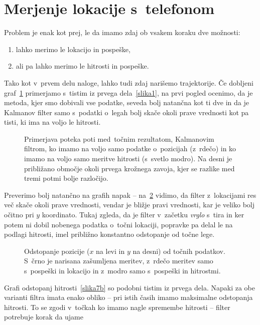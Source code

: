 \documentclass[a4paper,pdftex,10pt]{article}
\numberwithin{figure}{section} %
\begin{document}
\section{Merjenje lokacije s~telefonom}
Problem je enak kot prej, le da imamo zdaj ob vsakem koraku dve možnosti:
\begin{enumerate}[label=(\alph*)]
    \item lahko merimo le lokacijo in pospeške,
    \item ali pa lahko merimo le hitrosti in pospeške.
\end{enumerate}
Tako kot v~prvem delu naloge, lahko tudi zdaj narišemo trajektorije. Če dobljeni 
graf~\ref{slika6} primerjamo s~tistim iz prvega dela~\ref{slika1}, na prvi pogled ocenimo,
da je metoda, kjer smo dobivali vse podatke, seveda bolj natančna kot ti dve in da je 
Kalmanov filter samo s~podatki o~legah bolj skače okoli prave vrednosti kot pa tisti, ki 
ima na voljo le hitrosti. \begin{figure}[H]
    \centering
    \resizebox{.49\linewidth}{!}{}
    \resizebox{.49\linewidth}{!}{}
    \caption{Primerjava poteka poti med~točnim rezultatom, Kalmanovim filtrom, ko imamo
    na voljo samo podatke o~pozicijah (z~rdečo) in ko imamo na voljo samo meritve hitrosti
    (s~svetlo modro). Na desni je približano območje okoli prvega krožnega zavoja, kjer se
    razlike med tremi potmi bolje razločijo.}
    \label{slika6}
\end{figure}
Preverimo bolj natančno na grafih napak -- na~\ref{slika7a} vidimo, da filter z~lokacijami 
res več skače okoli prave vrednosti, vendar je bližje pravi vrednosti, kar je veliko bolj 
očitno pri $y$ koordinato. Tukaj zgleda, da je filter v~začetku \emph{vrglo} s~tira in ker 
potem ni dobil nobenega podatka o~točni lokaciji, popravke pa delal le na podlagi hitrosti, 
imel približno konstantno odstopanje od točne lege.
\begin{figure}[H]
    \centering
    \resizebox{.49\linewidth}{!}{}
    \resizebox{.49\linewidth}{!}{}
    \caption{Odstopanje pozicije ($x$ na levi in $y$ na desni) od točnih podatkov. S~črno
    je narisana zašumljena meritev, z~rdečo meritev samo s~pospeški in lokacijo in z~modro
    samo s~pospeški in hitrostmi.}
    \label{slika7a}
\end{figure}
Grafi odstopanj hitrosti~\ref{slika7b} so podobni tistim iz prvega dela. Napaki za obe
varianti filtra imata enako obliko -- pri istih časih imamo maksimalne odstopanja hitrosti.
To se zgodi v~točkah ko imamo nagle spremembe hitrosti -- filter potrebuje korak da ujame
\end{document}
